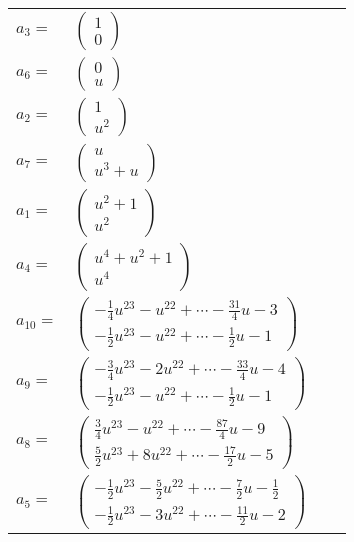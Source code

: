 \documentclass[1p]{elsarticle_modified}
\theoremstyle{definition}
\begin{document}
\begin{tabular}{m{7pt} m{180pt} m{7pt} m{180pt} }
\flushright $a_{3}=$&$\begin{pmatrix}1\\0\end{pmatrix}$ \\
\flushright $a_{6}=$&$\begin{pmatrix}0\\u\end{pmatrix}$ \\
\flushright $a_{2}=$&$\begin{pmatrix}1\\u^2\end{pmatrix}$ \\
\flushright $a_{7}=$&$\begin{pmatrix}u\\u^3+u\end{pmatrix}$ \\
\flushright $a_{1}=$&$\begin{pmatrix}u^2+1\\u^2\end{pmatrix}$ \\
\flushright $a_{4}=$&$\begin{pmatrix}u^4+u^2+1\\u^4\end{pmatrix}$ \\
\flushright $a_{10}=$&$\begin{pmatrix}-\frac{1}{4} u^{23}- u^{22}+\cdots-\frac{31}{4} u-3\\-\frac{1}{2} u^{23}- u^{22}+\cdots-\frac{1}{2} u-1\end{pmatrix}$ \\
\flushright $a_{9}=$&$\begin{pmatrix}-\frac{3}{4} u^{23}-2 u^{22}+\cdots-\frac{33}{4} u-4\\-\frac{1}{2} u^{23}- u^{22}+\cdots-\frac{1}{2} u-1\end{pmatrix}$ \\
\flushright $a_{8}=$&$\begin{pmatrix}\frac{3}{4} u^{23}- u^{22}+\cdots-\frac{87}{4} u-9\\\frac{5}{2} u^{23}+8 u^{22}+\cdots-\frac{17}{2} u-5\end{pmatrix}$ \\
\flushright $a_{5}=$&$\begin{pmatrix}-\frac{1}{2} u^{23}-\frac{5}{2} u^{22}+\cdots-\frac{7}{2} u-\frac{1}{2}\\-\frac{1}{2} u^{23}-3 u^{22}+\cdots-\frac{11}{2} u-2\end{pmatrix}$ \\

\end{tabular}
\end{document}
